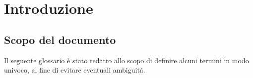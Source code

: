 \section{Introduzione}
\subsection{Scopo del documento}
Il seguente glossario è stato redatto allo scopo di definire alcuni termini in modo univoco, al fine di evitare eventuali ambiguità.


